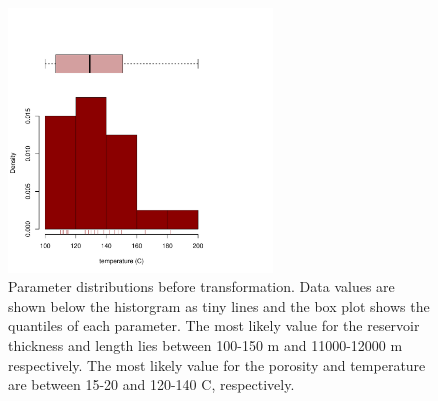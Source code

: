 \documentclass[review,authoryear, 12pt]{elsarticle}\usepackage[]{graphicx}\usepackage[]{color}
\newenvironment{knitrout}{}{} %
\begin{document}
\begin{knitrout}
\begin{figure}[]
\includegraphics[width=7cm,height=7cm]{figure/histplots4} \caption[Parameter distributions before transformation]{Parameter distributions before transformation. Data values are shown below the historgram as tiny lines and the box plot shows the quantiles of each parameter. The most likely value for the reservoir thickness and length lies between 100-150 m and 11000-12000 m respectively. The most likely value for the porosity and temperature are between 15-20 and 120-140 \degree C, respectively.\label{Fig:histplots}}
\end{figure}


\end{knitrout}
\end{document}
